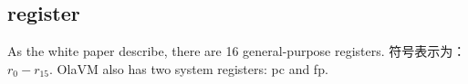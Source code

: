 \subsection{register}\label{subsec: processor-register}

As the white paper describe, there are 16 general-purpose registers.
符号表示为： $ r_0 - r_{15} $.
OlaVM also has two system registers: pc and fp.
